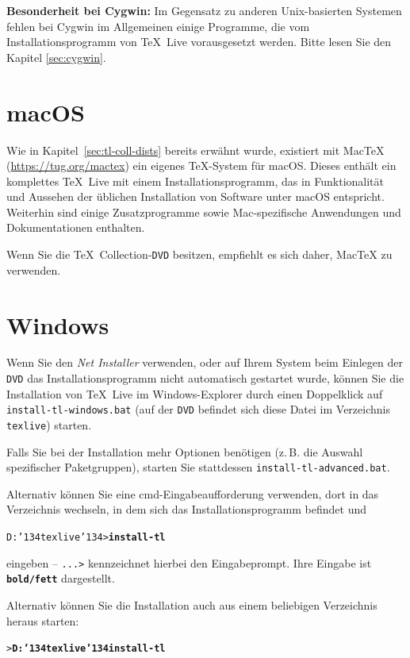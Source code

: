 \documentclass[12pt,ngerman,a4paper,fullparskip]{scrreprt}
\newcommand{\TL}{\TeX\ Live\xspace}
\newcommand{\acro}[1]{\texttt{#1}}
\newcommand{\filename}[1]{\texttt{#1}}
\newcommand{\Ucom}[1]{\textbf{\texttt{#1}}}
\newcommand{\bs}{\protect\normalfont\ttfamily\char'134}
\def\TK{\TeX\ Collection}
\providecommand*{\DVD}{\acro{DVD}\xspace}
\providecommand*{\macOS}{macOS\xspace}
\begin{document}
\textbf{Besonderheit bei Cygwin:} Im Gegensatz zu anderen Unix-basierten
Systemen fehlen bei Cygwin im Allgemeinen einige Programme, die vom Installationsprogramm von \TL vorausgesetzt werden. Bitte lesen Sie den Kapitel \ref{sec:cygwin}.


\section{\macOS}

Wie in Kapitel~\ref{sec:tl-coll-dists} bereits erwähnt wurde, existiert mit Mac\TeX{} (\url{https://tug.org/mactex}) ein eigenes \TeX-System für \macOS. Dieses enthält ein komplettes \TL mit einem Installationsprogramm, das in Funktionalität und Aussehen  der üblichen Installation von Software unter \macOS entspricht. Weiterhin sind einige Zusatzprogramme sowie Mac-spezifische Anwendungen und Dokumentationen enthalten.

Wenn Sie die \TK-\DVD besitzen, empfiehlt es sich daher, Mac\TeX{} zu verwenden.

\section{Windows}

Wenn Sie den \emph{Net Installer} verwenden, oder auf Ihrem System beim Einlegen der \DVD das Installationsprogramm nicht automatisch gestartet wurde, können Sie die Installation von \TL im Windows-Explorer durch einen Doppelklick auf \filename{install-tl-windows.bat} (auf der \DVD befindet sich diese Datei im Verzeichnis \texttt{texlive}) starten.

Falls Sie bei der Installation mehr Optionen benötigen (z.\,B. die Auswahl
spezifischer Paketgruppen), starten Sie stattdessen \filename{install-tl-advanced.bat}.

Alternativ können Sie eine cmd-Eingabeaufforderung verwenden, dort in das Verzeichnis wechseln, in dem sich das Installationsprogramm befindet und 

\begin{alltt}
D:\bs{}texlive\bs{}> \Ucom{install-tl}
\end{alltt}

eingeben -- \texttt{...>} kennzeichnet hierbei den Eingabeprompt. Ihre Eingabe ist \Ucom{\texttt{bold/fett}} dargestellt.

Alternativ können Sie die Installation auch aus einem beliebigen Verzeichnis heraus starten:

\begin{alltt}
> \Ucom{D:\bs{}texlive\bs{}install-tl}
\end{alltt}
\end{document}
